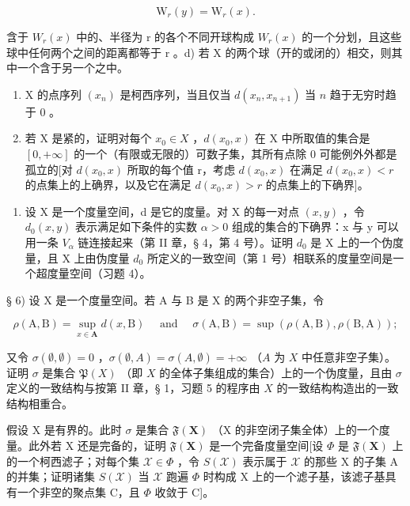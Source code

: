 \[
\mathrm{W} _ {r} (y) = \mathrm{W} _ {r} (x).
\]

含于 \(W_{r}(x)\) 中的、半径为 r 的各个不同开球构成 \(W_{r}(x)\) 的一个分划，且这些球中任何两个之间的距离都等于 r 。d) 若 X 的两个球（开的或闭的）相交，则其中一个含于另一个之中。

\begin{enumerate}
\def\labelenumi{\alph{enumi})}
\setcounter{enumi}{4}
\item
  X 的点序列 \((x_{n})\) 是柯西序列，当且仅当 \(d(x_{n}, x_{n+1})\) 当 \(n\) 趋于无穷时趋于 0 。
\item
  若 X 是紧的，证明对每个 \(x_{0} \in X\) ，\(d(x_{0}, x)\) 在 X 中所取值的集合是 \([0, +\infty]\) 的一个（有限或无限的）可数子集，其所有点除 0 可能例外外都是孤立的{[}对 \(d(x_{0}, x)\) 所取的每个值 r，考虑 \(d(x_{0}, x)\) 在满足 \(d(x_{0}, x) < r\) 的点集上的上确界，以及它在满足 \(d(x_{0}, x) > r\) 的点集上的下确界{]}。
\end{enumerate}

\begin{enumerate}
\def\labelenumi{\arabic{enumi})}
\setcounter{enumi}{4}
\tightlist
\item
  设 X 是一个度量空间，d 是它的度量。对 X 的每一对点 \((x, y)\) ，令 \(d_{0}(x, y)\) 表示满足如下条件的实数 \(\alpha > 0\) 组成的集合的下确界：x 与 y 可以用一条 \(V_{\alpha}\) 链连接起来（第 II 章，§ 4，第 4 号）。证明 \(d_{0}\) 是 X 上的一个伪度量，且 X 上由伪度量 \(d_{0}\) 所定义的一致空间（第 1 号）相联系的度量空间是一个超度量空间（习题 4）。
\end{enumerate}

§ 6) 设 X 是一个度量空间。若 A 与 B 是 X 的两个非空子集，令

\[
\rho (\mathrm{A}, \mathrm{B}) = \sup _ {x \in \mathbf {A}} d (x, \mathrm{B}) \quad \text { and } \quad \sigma (\mathrm{A}, \mathrm{B}) = \sup \left(\rho (\mathrm{A}, \mathrm{B}), \rho (\mathrm{B}, \mathrm{A})\right);
\]

又令 \(\sigma(\emptyset, \emptyset) = 0\) ，\(\sigma(\emptyset, A) = \sigma(A, \emptyset) = +\infty\) （\(A\) 为 \(X\) 中任意非空子集）。证明 \(\sigma\) 是集合 \(\mathfrak{P}(X)\) （即 \(X\) 的全体子集组成的集合）上的一个伪度量，且由 \(\sigma\) 定义的一致结构与按第 II 章，§ 1，习题 5 的程序由 \(X\) 的一致结构构造出的一致结构相重合。

假设 X 是有界的。此时 \(\sigma\) 是集合 \(\mathfrak{F}(\mathbf{X})\) （X 的非空闭子集全体）上的一个度量。此外若 X 还是完备的，证明 \(\mathfrak{F}(\mathbf{X})\) 是一个完备度量空间{[}设 \(\Phi\) 是 \(\mathfrak{F}(\mathbf{X})\) 上的一个柯西滤子；对每个集 \(\mathcal{X} \in \Phi\) ，令 \(S(\mathcal{X})\) 表示属于 \(\mathcal{X}\) 的那些 X 的子集 A 的并集；证明诸集 \(S(\mathcal{X})\) 当 \(\mathcal{X}\) 跑遍 \(\Phi\) 时构成 X 上的一个滤子基，该滤子基具有一个非空的聚点集 C，且 \(\Phi\) 收敛于 C{]}。

